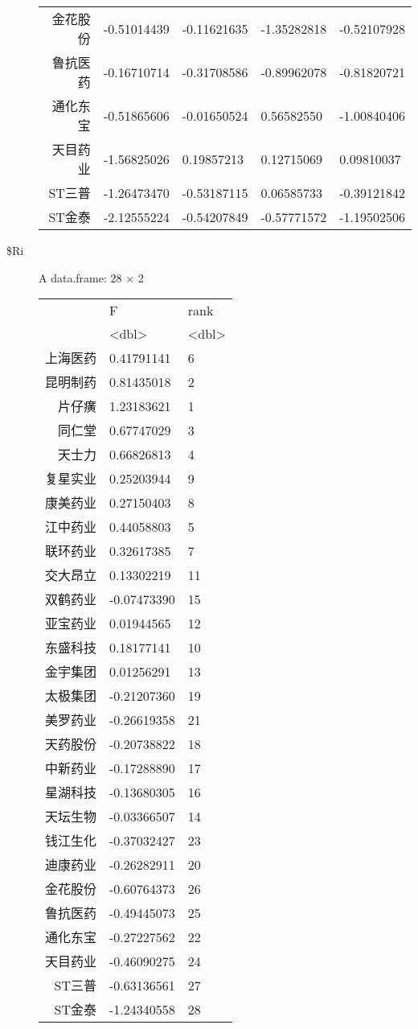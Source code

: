\documentclass[UTF8,a4paper]{ctexart}
\begin{document}
\begin{description}
\begin{tabular}{r|llll}
	金花股份 & -0.51014439 & -0.11621635 & -1.35282818 & -0.52107928\\
	鲁抗医药 & -0.16710714 & -0.31708586 & -0.89962078 & -0.81820721\\
	通化东宝 & -0.51865606 & -0.01650524 &  0.56582550 & -1.00840406\\
	天目药业 & -1.56825026 &  0.19857213 &  0.12715069 &  0.09810037\\
	ST三普 & -1.26473470 & -0.53187115 &  0.06585733 & -0.39121842\\
	ST金泰 & -2.12555224 & -0.54207849 & -0.57771572 & -1.19502506\\
\end{tabular}

\item[\$Ri] A data.frame: 28 × 2
\begin{tabular}{r|ll}
  & F & rank\\
  & <dbl> & <dbl>\\
\hline
	上海医药 &  0.41791141 &  6\\
	昆明制药 &  0.81435018 &  2\\
	片仔癀 &  1.23183621 &  1\\
	同仁堂 &  0.67747029 &  3\\
	天士力 &  0.66826813 &  4\\
	复星实业 &  0.25203944 &  9\\
	康美药业 &  0.27150403 &  8\\
	江中药业 &  0.44058803 &  5\\
	联环药业 &  0.32617385 &  7\\
	交大昂立 &  0.13302219 & 11\\
	双鹤药业 & -0.07473390 & 15\\
	亚宝药业 &  0.01944565 & 12\\
	东盛科技 &  0.18177141 & 10\\
	金宇集团 &  0.01256291 & 13\\
	太极集团 & -0.21207360 & 19\\
	美罗药业 & -0.26619358 & 21\\
	天药股份 & -0.20738822 & 18\\
	中新药业 & -0.17288890 & 17\\
	星湖科技 & -0.13680305 & 16\\
	天坛生物 & -0.03366507 & 14\\
	钱江生化 & -0.37032427 & 23\\
	迪康药业 & -0.26282911 & 20\\
	金花股份 & -0.60764373 & 26\\
	鲁抗医药 & -0.49445073 & 25\\
	通化东宝 & -0.27227562 & 22\\
	天目药业 & -0.46090275 & 24\\
	ST三普 & -0.63136561 & 27\\
	ST金泰 & -1.24340558 & 28\\
\end{tabular}

\end{description}
\end{document}
